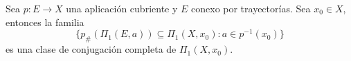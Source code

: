\begin{ejercicio}
    Sea $p:E\to X$ una aplicación cubriente y $E$ conexo por trayectorías. Sea $x_0\in X$, entonces la familia
    \begin{equation*}
        \{p_\#(\Pi_1(E,a))\subseteq \Pi_1(X,x_0):a\in p^{-1}(x_0)\}
    \end{equation*}
    es una clase de conjugación completa de $\Pi_1(X,x_0).$
\end{ejercicio}

\begin{demostracion}

\end{demostracion}
